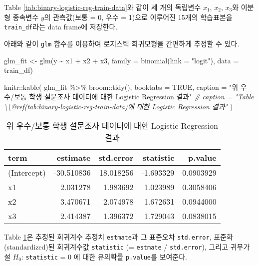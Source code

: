 \documentclass[
]{book}
\newenvironment{Shaded}{\begin{snugshade}}{\end{snugshade}}
\newcommand{\AttributeTok}[1]{\textcolor[rgb]{0.77,0.63,0.00}{#1}}
\newcommand{\CommentTok}[1]{\textcolor[rgb]{0.56,0.35,0.01}{\textit{#1}}}
\newcommand{\ConstantTok}[1]{\textcolor[rgb]{0.00,0.00,0.00}{#1}}
\newcommand{\FunctionTok}[1]{\textcolor[rgb]{0.00,0.00,0.00}{#1}}
\newcommand{\NormalTok}[1]{#1}
\newcommand{\OtherTok}[1]{\textcolor[rgb]{0.56,0.35,0.01}{#1}}
\newcommand{\SpecialCharTok}[1]{\textcolor[rgb]{0.00,0.00,0.00}{#1}}
\newcommand{\StringTok}[1]{\textcolor[rgb]{0.31,0.60,0.02}{#1}}
\begin{document}
Table \ref{tab:binary-logistic-reg-train-data}와 같이 세 개의 독립변수 \(x_1\), \(x_2\), \(x_3\)와 이분형 종속변수 \(y\)의 관측값(보통 = 0, 우수 = 1)으로 이루어진 15개의 학습표본을 \texttt{train\_df}라는 data frame에 저장한다.

아래와 같이 \texttt{glm} 함수를 이용하여 로지스틱 회귀모형을 간편하게 추정할 수 있다.

\begin{Shaded}
\begin{Highlighting}[]
\NormalTok{glm\_fit }\OtherTok{\textless{}{-}} \FunctionTok{glm}\NormalTok{(y }\SpecialCharTok{\textasciitilde{}}\NormalTok{ x1 }\SpecialCharTok{+}\NormalTok{ x2 }\SpecialCharTok{+}\NormalTok{ x3, }\AttributeTok{family =} \FunctionTok{binomial}\NormalTok{(}\AttributeTok{link =} \StringTok{"logit"}\NormalTok{), }\AttributeTok{data =}\NormalTok{ train\_df)}

\NormalTok{knitr}\SpecialCharTok{::}\FunctionTok{kable}\NormalTok{(}
\NormalTok{  glm\_fit }\SpecialCharTok{\%\textgreater{}\%}\NormalTok{  broom}\SpecialCharTok{::}\FunctionTok{tidy}\NormalTok{(),}
  \AttributeTok{booktabs =} \ConstantTok{TRUE}\NormalTok{,}
  \AttributeTok{caption =} \StringTok{"위 우수/보통 학생 설문조사 데이터에 대한 Logistic Regression 결과"}
\CommentTok{\#  caption = "Table \textbackslash{}\textbackslash{}@ref(tab:binary{-}logistic{-}reg{-}train{-}data)에 대한 Logistic Regression 결과"}
\NormalTok{  )}
\end{Highlighting}
\end{Shaded}

\begin{table}

\caption{\label{tab:binary-logistic-reg-coef}위 우수/보통 학생 설문조사 데이터에 대한 Logistic Regression 결과}
\centering
\begin{tabular}[t]{lrrrr}
\toprule
term & estimate & std.error & statistic & p.value\\
\midrule
(Intercept) & -30.510836 & 18.018256 & -1.693329 & 0.0903929\\
x1 & 2.031278 & 1.983692 & 1.023989 & 0.3058406\\
x2 & 3.470671 & 2.074978 & 1.672631 & 0.0944000\\
x3 & 2.414387 & 1.396372 & 1.729043 & 0.0838015\\
\bottomrule
\end{tabular}
\end{table}

Table \ref{tab:binary-logistic-reg-coef}은 추정된 회귀계수 추정치 \texttt{estmate}과 그 표준오차 \texttt{std.error}, 표준화(standardized)된 회귀계수값 \texttt{statistic} (= \texttt{estmate} / \texttt{std.error}), 그리고 귀무가설 \(H_0\): \texttt{statistic} = 0 에 대한 유의확률 \texttt{p.value}를 보여준다.
\end{document}
